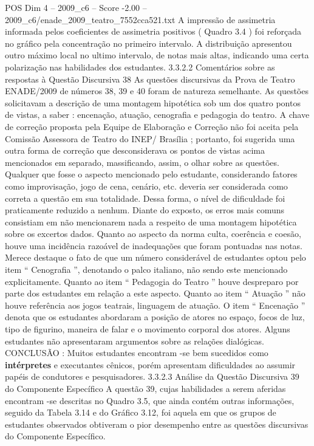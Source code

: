 \begin{textsample}{POS Dim 4 – 2009\_c6 – Score -2.00 – 2009\_c6/enade\_2009\_teatro\_7552cca521.txt}
A impressão de assimetria informada pelos coeficientes de assimetria positivos ( Quadro 3.4 ) foi reforçada no gráfico pela concentração no primeiro intervalo.
A distribuição apresentou outro máximo local no ultimo intervalo, de notas mais altas, indicando uma certa polarização nas habilidades dos estudantes. 3.3.2.2 Comentários sobre as respostas à Questão Discursiva 38 As questões discursivas da Prova de Teatro ENADE/2009 de números 38, 39 e 40 foram de natureza semelhante.
As questões solicitavam a descrição de uma montagem hipotética sob um dos quatro pontos de vistas, a saber : encenação, atuação, cenografia e pedagogia do teatro.
A chave de correção proposta pela Equipe de Elaboração e Correção não foi aceita pela Comissão Assessora de Teatro do INEP/ Brasília ; portanto, foi sugerida uma outra forma de correção que desconsiderava os pontos de vistas acima mencionados em separado, massificando, assim, o olhar sobre as questões.
Qualquer que fosse o aspecto mencionado pelo estudante, considerando fatores como improvisação, jogo de cena, cenário, etc. deveria ser considerada como correta a questão em sua totalidade.
Dessa forma, o nível de dificuldade foi praticamente reduzido a nenhum.
Diante do exposto, os erros mais comuns consistiam em não mencionarem nada a respeito de uma montagem hipotética sobre os excertos dados.
Quanto ao aspecto da norma culta, coerência e coesão, houve uma incidência razoável de inadequações que foram pontuadas nas notas.
Merece destaque o fato de que um número considerável de estudantes optou pelo item “ Cenografia ”, denotando o palco italiano, não sendo este mencionado explicitamente.
Quanto ao item “ Pedagogia do Teatro ” houve despreparo por parte dos estudantes em relação a este aspecto.
Quanto ao item “ Atuação ” não houve referência aos jogos teatrais, linguagem de atuação.
O item “ Encenação ” denota que os estudantes abordaram a posição de atores no espaço, focos de luz, tipo de figurino, maneira de falar e o movimento corporal dos atores.
Alguns estudantes não apresentaram argumentos sobre as relações dialógicas.
CONCLUSÃO : Muitos estudantes encontram -se bem sucedidos como \textbf{intérpretes} e executantes cênicos, porém apresentam dificuldades ao assumir papéis de condutores e pesquisadores. 3.3.2.3 Análise da Questão Discursiva 39 do Componente Específico A questão 39, cujas habilidades a serem aferidas encontram -se descritas no Quadro 3.5, que ainda contém outras informações, seguido da Tabela 3.14 e do Gráfico 3.12, foi aquela em que os grupos de estudantes observados obtiveram o pior desempenho entre as questões discursivas do Componente Específico.

\end{textsample}
